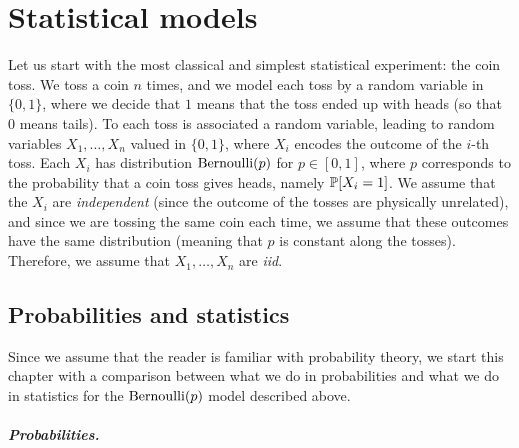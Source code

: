\setchapterpreamble[u]{\margintoc}
\chapter{Statistical models}
\label{chap:statistical_models}

Let us start with the most classical and simplest statistical experiment: the coin toss.
We toss a coin $n$ times, and we model each toss by a random variable in $\{ 0, 1 \}$, where we decide that $1$ means that the toss ended up with heads (so that $0$ means tails).
To each toss is associated a random variable, leading to random variables $X_1, \ldots, X_n$  valued in $\{ 0, 1 \}$, where $X_i$ encodes the outcome of the $i$-th toss.
Each $X_i$ has distribution $\ber(p)$ for $p \in [0, 1]$, where $p$ corresponds to the probability that a coin toss gives heads, namely $\P[X_i = 1]$.%
We assume that the $X_i$ are \emph{independent} (since the outcome of the tosses are physically unrelated), and since we are tossing the same coin each time, we assume that these outcomes have the same distribution (meaning that $p$ is constant along the tosses).
Therefore, we assume that $X_1, \ldots, X_n$ are \emph{iid}.%

\section{Probabilities and statistics} %
\label{sec:probability_versus_statistics}

Since we assume that the reader is familiar with probability theory, we start this chapter with a comparison between what we do in probabilities and what we do in statistics for the $\ber(p)$ model described above.

\paragraph{Probabilities.} %

